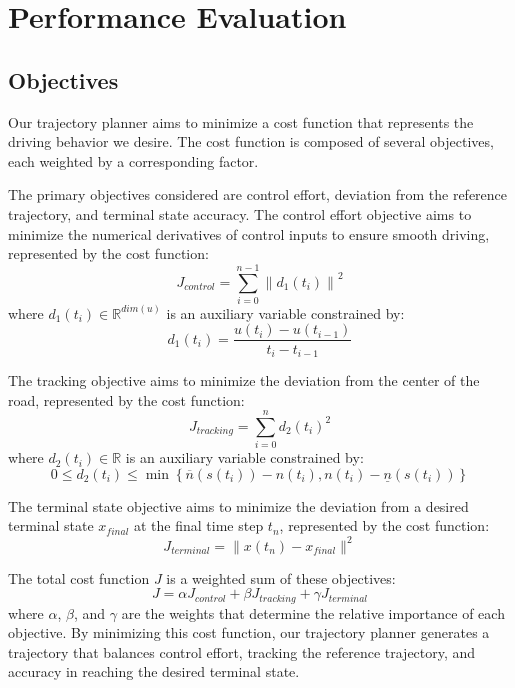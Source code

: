 \section{Performance Evaluation} \label{sec:performance-evaluation}

\subsection{Objectives} \label{subsec:objectives}

Our trajectory planner aims to minimize a cost function that represents the driving behavior we desire.
The cost function is composed of several objectives, each weighted by a corresponding factor.

The primary objectives considered are control effort, deviation from the reference trajectory, and terminal state accuracy.
The control effort objective aims to minimize
the numerical derivatives of control inputs to ensure smooth driving, represented by the cost function:
\begin{equation}
	J_{control} = \sum_{i=0}^{n-1} \left\| d_1(t_i) \right\|^2
\end{equation}
where $d_1(t_i)\in \mathbb{R}^{dim(u)}$ is an auxiliary variable constrained by: \[
	d_1(t_i) = \frac{u(t_i) - u(t_{i-1})}{t_i - t_{i-1}}
\]

The tracking objective aims to minimize the deviation from the center of the road, represented by the cost function:
\begin{equation}
	J_{tracking} = \sum_{i=0}^{n} d_2(t_i)^2
\end{equation}
where $d_2(t_i)\in \mathbb{R}$ is an auxiliary variable constrained by: \[
	0 \leq d_2(t_i) \leq \min \left\{ \overline{n}(s(t_i)) - n(t_i), n(t_i) - \underline{n}(s(t_i)) \right\}
\]

The terminal state objective aims to minimize the deviation from a desired terminal state $x_{final}$ at the final time step $t_n$, represented by the cost function:
\begin{equation}
	J_{terminal} = \|x(t_n) - x_{final}\|^2
\end{equation}

The total cost function $J$ is a weighted sum of these objectives:
\begin{equation}
	J = \alpha J_{control} + \beta J_{tracking} + \gamma J_{terminal} \label{eq:cost_function_combined} \end{equation} where $\alpha$, $\beta$, and
$\gamma$ are the weights that determine the relative importance of each objective.
By minimizing this cost function, our trajectory planner generates a trajectory that balances control effort, tracking the reference trajectory, and
accuracy in reaching the desired terminal state.

